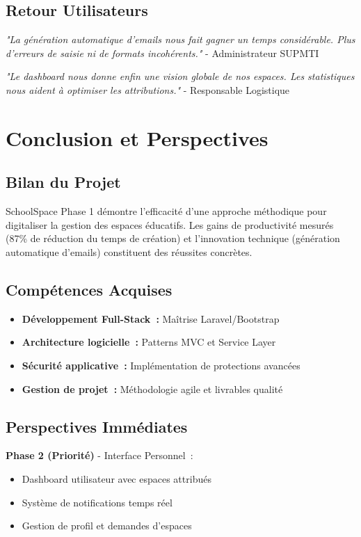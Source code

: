 \documentclass[12pt, a4paper, twoside, openany]{report}
\begin{document}
\section{Retour Utilisateurs}

\textit{"La génération automatique d'emails nous fait gagner un temps considérable. Plus d'erreurs de saisie ni de formats incohérents."} - Administrateur SUPMTI

\textit{"Le dashboard nous donne enfin une vision globale de nos espaces. Les statistiques nous aident à optimiser les attributions."} - Responsable Logistique

\chapter*{Conclusion et Perspectives}

\section*{Bilan du Projet}

SchoolSpace Phase 1 démontre l'efficacité d'une approche méthodique pour digitaliser la gestion des espaces éducatifs. Les gains de productivité mesurés (87\% de réduction du temps de création) et l'innovation technique (génération automatique d'emails) constituent des réussites concrètes.

\section*{Compétences Acquises}
\begin{itemize}
    \item \textbf{Développement Full-Stack~:} Maîtrise Laravel/Bootstrap
    \item \textbf{Architecture logicielle~:} Patterns MVC et Service Layer
    \item \textbf{Sécurité applicative~:} Implémentation de protections avancées
    \item \textbf{Gestion de projet~:} Méthodologie agile et livrables qualité
\end{itemize}

\section*{Perspectives Immédiates}

\textbf{Phase 2 (Priorité)} - Interface Personnel~:
\begin{itemize}
    \item Dashboard utilisateur avec espaces attribués
    \item Système de notifications temps réel  
    \item Gestion de profil et demandes d'espaces
\end{itemize}
\end{document}
